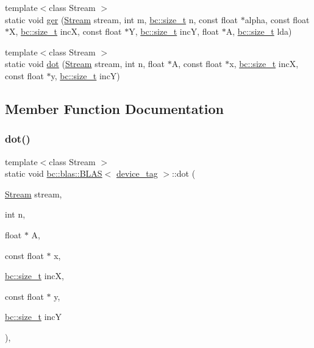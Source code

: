 \begin{DoxyCompactItemize}
\item 
{\footnotesize template$<$class Stream $>$ }\\static void \hyperlink{structbc_1_1blas_1_1BLAS_3_01device__tag_01_4_aebaf3d1509c53d5eff0d9670cd0de23d}{ger} (\hyperlink{classbc_1_1streams_1_1Stream}{Stream} stream, int m, \hyperlink{namespacebc_aaf8e3fbf99b04b1b57c4f80c6f55d3c5}{bc\+::size\+\_\+t} n, const float $\ast$alpha, const float $\ast$X, \hyperlink{namespacebc_aaf8e3fbf99b04b1b57c4f80c6f55d3c5}{bc\+::size\+\_\+t} incX, const float $\ast$Y, \hyperlink{namespacebc_aaf8e3fbf99b04b1b57c4f80c6f55d3c5}{bc\+::size\+\_\+t} incY, float $\ast$A, \hyperlink{namespacebc_aaf8e3fbf99b04b1b57c4f80c6f55d3c5}{bc\+::size\+\_\+t} lda)
\item 
{\footnotesize template$<$class Stream $>$ }\\static void \hyperlink{structbc_1_1blas_1_1BLAS_3_01device__tag_01_4_a8cd7b3bf4300f025bb9ac8781bb5e043}{dot} (\hyperlink{classbc_1_1streams_1_1Stream}{Stream} stream, int n, float $\ast$A, const float $\ast$x, \hyperlink{namespacebc_aaf8e3fbf99b04b1b57c4f80c6f55d3c5}{bc\+::size\+\_\+t} incX, const float $\ast$y, \hyperlink{namespacebc_aaf8e3fbf99b04b1b57c4f80c6f55d3c5}{bc\+::size\+\_\+t} incY)
\end{DoxyCompactItemize}


\subsection{Member Function Documentation}
\mbox{\label{structbc_1_1blas_1_1BLAS_3_01device__tag_01_4_a8cd7b3bf4300f025bb9ac8781bb5e043}} 
\subsubsection{\texorpdfstring{dot()}{dot()}}
{\footnotesize\ttfamily template$<$class Stream $>$ \\
static void \hyperlink{structbc_1_1blas_1_1BLAS}{bc\+::blas\+::\+B\+L\+AS}$<$ \hyperlink{structbc_1_1device__tag}{device\+\_\+tag} $>$\+::dot (\begin{DoxyParamCaption}\item[{\hyperlink{classbc_1_1streams_1_1Stream}{Stream}}]{stream,  }\item[{int}]{n,  }\item[{float $\ast$}]{A,  }\item[{const float $\ast$}]{x,  }\item[{\hyperlink{namespacebc_aaf8e3fbf99b04b1b57c4f80c6f55d3c5}{bc\+::size\+\_\+t}}]{incX,  }\item[{const float $\ast$}]{y,  }\item[{\hyperlink{namespacebc_aaf8e3fbf99b04b1b57c4f80c6f55d3c5}{bc\+::size\+\_\+t}}]{incY }\end{DoxyParamCaption})\hspace{0.3cm}{\ttfamily [inline]}, {\ttfamily [static]}}

